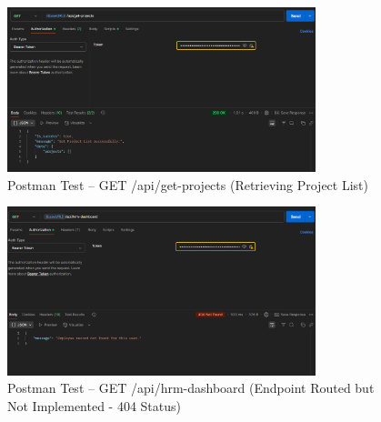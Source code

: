 \begin{figure}[H]
    \centering
    \includegraphics[width=0.8\textwidth]{chapters/chapter 3/hrmFigures/get-projects.png}
    \caption{Postman Test -- GET /api/get-projects (Retrieving Project List)}
    \label{fig:postman_get_projects}
\end{figure}

\begin{figure}[H]
    \centering
    \includegraphics[width=0.8\textwidth]{chapters/chapter 3/hrmFigures/hrm_employee_not_found.png}
    \caption{Postman Test -- GET /api/hrm-dashboard (Endpoint Routed but Not Implemented - 404 Status)}
    \label{fig:postman_hrm_404}
\end{figure}
